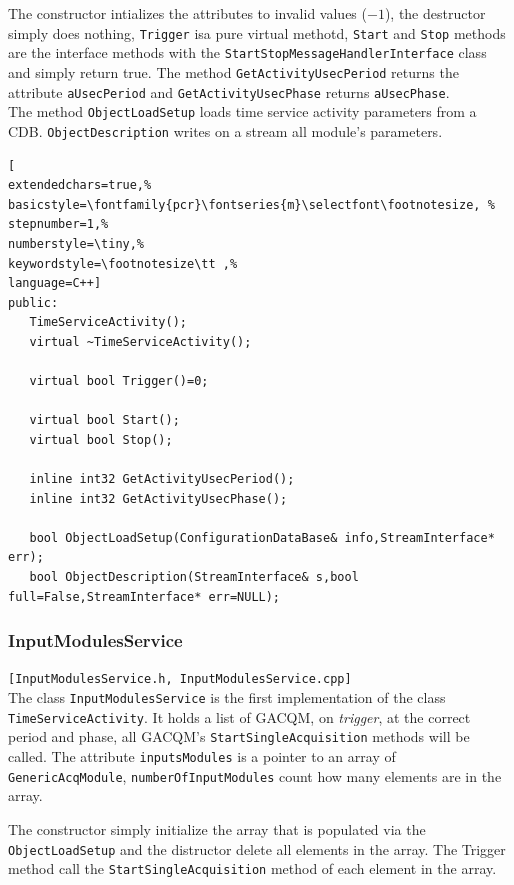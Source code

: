 The constructor intializes the attributes to invalid values ($-1$), the destructor simply does nothing, \texttt{Trigger} isa pure virtual methotd, \texttt{Start} and \texttt{Stop} methods are the interface methods with the \texttt{StartStopMessageHandlerInterface} class and simply return true. The method \texttt{GetActivityUsecPeriod} returns the attribute \texttt{aUsecPeriod} and \texttt{GetActivityUsecPhase} returns \texttt{aUsecPhase}. \\


The method \texttt{ObjectLoadSetup} loads time service activity parameters from a CDB. \texttt{ObjectDescription} writes on a stream all module's parameters.

\begin{lstlisting}[
extendedchars=true,%
basicstyle=\fontfamily{pcr}\fontseries{m}\selectfont\footnotesize, %
stepnumber=1,%
numberstyle=\tiny,%
keywordstyle=\footnotesize\tt ,%
language=C++]
public:
   TimeServiceActivity();
   virtual ~TimeServiceActivity();

   virtual bool Trigger()=0;

   virtual bool Start();
   virtual bool Stop();

   inline int32 GetActivityUsecPeriod();
   inline int32 GetActivityUsecPhase();

   bool ObjectLoadSetup(ConfigurationDataBase& info,StreamInterface* err);
   bool ObjectDescription(StreamInterface& s,bool full=False,StreamInterface* err=NULL);
\end{lstlisting}



\subsubsection{InputModulesService}
\texttt{[InputModulesService.h, InputModulesService.cpp]} \\
The class \texttt{InputModulesService} is the first implementation of the class \texttt{TimeServiceActivity}. It holds a list of GACQM, on \textit{trigger}, at the correct period and phase, all GACQM's \texttt{StartSingleAcquisition} methods will be called. The attribute \texttt{inputsModules} is a pointer to an array of \texttt{GenericAcqModule}, \texttt{numberOfInputModules} count how many elements are in the array.

The constructor simply initialize the array that is populated via the \texttt{ObjectLoadSetup} and the distructor delete all elements in the array. The Trigger method call the \texttt{StartSingleAcquisition} method of each element in the array.

